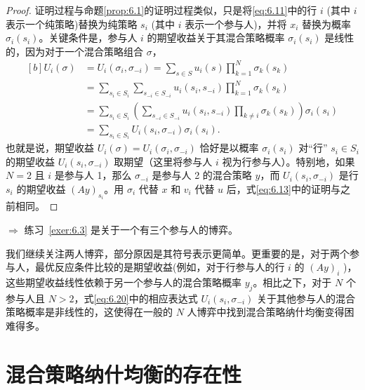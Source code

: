 \begin{proof}
证明过程与命题\ref{prop:6.1}的证明过程类似，只是将\eqref{eq:6.11}中的行 \(i\) (其中 \(i\) 表示一个纯策略)替换为纯策略 \({s}_{i}\) (其中 \(i\) 表示一个参与人)，并将 \({x}_{i}\) 替换为概率 \({\sigma }_{i}\left( {s}_{i}\right)\)。关键条件是，参与人 \(i\) 的期望收益关于其混合策略概率 \({\sigma }_{i}\left( {s}_{i}\right)\) 是线性的，因为对于一个混合策略组合 \(\sigma\)，
\begin{equation} \label{eq:6.20}
\begin{aligned}[b]
U_{i}(\sigma) 
&= U_{i}(\sigma_{i}, \sigma_{-i}) = \sum_{s \in S} u_{i}(s) \prod_{k=1}^{N} \sigma_{k}(s_{k}) \\
&= \sum_{s_{i} \in S_{i}} \sum_{s_{-i} \in S_{-i}} u_{i}(s_{i}, s_{-i}) \prod_{k=1}^{N} \sigma_{k}(s_{k}) \\
&= \sum_{s_{i} \in S_{i}} \left( \sum_{s_{-i} \in S_{-i}} u_{i}(s_{i}, s_{-i}) \prod_{k \neq i} \sigma_{k}(s_{k}) \right) \sigma_{i}(s_{i}) \\
&= \sum_{s_{i} \in S_{i}} U_{i}(s_{i}, \sigma_{-i}) \sigma_{i}(s_{i}).
\end{aligned}
\end{equation}
也就是说，期望收益 \({U}_{i}\left( \sigma \right)  = {U}_{i}\left( {{\sigma }_{i},{\sigma }_{-i}}\right)\) 恰好是以概率 \({\sigma }_{i}\left( {s}_{i}\right)\) 对“行” \({s}_{i} \in  {S}_{i}\) 的期望收益 \({U}_{i}\left( {{s}_{i},{\sigma }_{-i}}\right)\) 取期望（这里将参与人 \(i\) 视为行参与人）。特别地，如果 \(N = 2\) 且 \(i\) 是参与人 1，那么 \({\sigma }_{-i}\) 是参与人 2 的混合策略 \(y\)，而 \({U}_{i}\left( {{s}_{i},{\sigma }_{-i}}\right)\) 是行 \({s}_{i}\) 的期望收益 \({\left( Ay\right) }_{{s}_{i}}\)。用 \({\sigma }_{i}\) 代替 \(x\) 和 \({v}_{i}\) 代替 \(u\) 后，式\eqref{eq:6.13}中的证明与之前相同。
\end{proof}

{\(\Rightarrow\) 练习~\ref{exer:6.3} 是关于一个有三个参与人的博弈。}

我们继续关注两人博弈，部分原因是其符号表示更简单。更重要的是，对于两个参与人，最优反应条件比较的是期望收益(例如，对于行参与人的行 \(i\) 的 \({\left( Ay\right) }_{i}\) )，这些期望收益线性依赖于另一个参与人的混合策略概率 \({y}_{j}\)。相比之下，对于 \(N\) 个参与人且 \(N > 2\)，式\eqref{eq:6.20}中的相应表达式 \({U}_{i}\left( {{s}_{i},{\sigma }_{-i}}\right)\) 关于其他参与人的混合策略概率是非线性的，这使得在一般的 \(N\) 人博弈中找到混合策略纳什均衡变得困难得多。

\section{混合策略纳什均衡的存在性}   \label{sec6.5}

